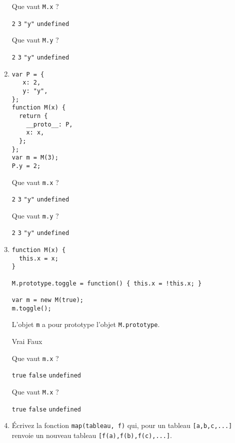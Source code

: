 \documentclass[a4paper, 12pt]{article}
\newcommand{\choice}[1]{\Square\hspace{2pt} #1\hspace{5pt}}
\newcommand{\choicec}[1]{\Square\hspace{2pt} \lstinline{#1}\hspace{5pt}}
\begin{document}
\begin{enumerate}
  Que vaut \lstinline{M.x} ?

  \choicec{2} \choicec{3} \choicec{"y"} \choicec{undefined}

  Que vaut \lstinline{M.y} ?

  \choicec{2} \choicec{3} \choicec{"y"} \choicec{undefined}
\item \lstset{language=javascript}
\begin{lstlisting}
var P = {
   x: 2,
   y: "y",
};
function M(x) {
  return {
    __proto__: P,
    x: x,
  };
};
var m = M(3);
P.y = 2;
\end{lstlisting}

  Que vaut \lstinline{m.x} ?

  \choicec{2} \choicec{3} \choicec{"y"} \choicec{undefined}

  Que vaut \lstinline{m.y} ?

  \choicec{2} \choicec{3} \choicec{"y"} \choicec{undefined}
\item \lstset{language=javascript}
\begin{lstlisting}
function M(x) {
  this.x = x;
}

M.prototype.toggle = function() { this.x = !this.x; }

var m = new M(true);
m.toggle();
\end{lstlisting}

  L'objet \lstinline{m} a pour prototype l'objet
  \lstinline{M.prototype}.

  \choice{Vrai} \choice{Faux}

  Que vaut \lstinline{m.x} ?

  \choicec{true} \choicec{false} \choicec{undefined}

  Que vaut \lstinline{M.x} ?

  \choicec{true} \choicec{false} \choicec{undefined}
\item Écrivez la fonction \lstinline{map(tableau, f)} qui, pour un
  tableau \lstinline{[a,b,c,...]} renvoie un nouveau tableau
  \lstinline{[f(a),f(b),f(c),...]}.
\end{enumerate}
\end{document}
